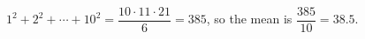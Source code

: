 $1^2+2^2+\cdots+10^2=\dfrac{10\cdot11\cdot21}{6}=385$, so the mean is $\dfrac{385}{10}=\boxed{38.5}$.
